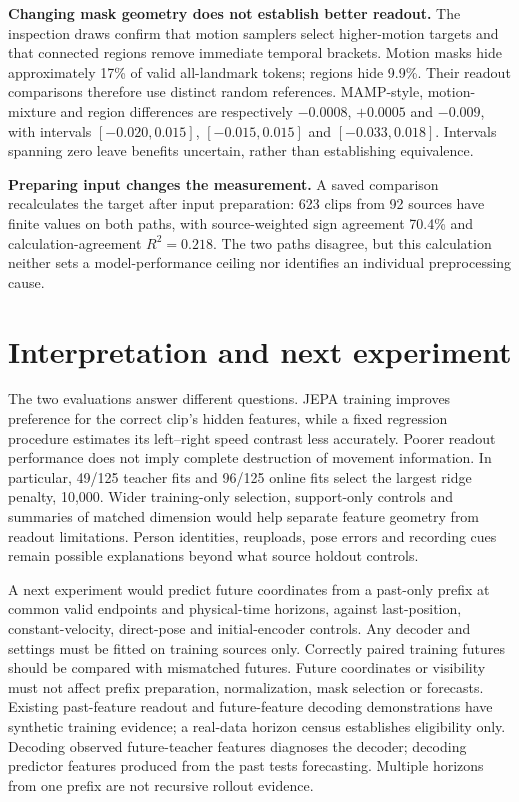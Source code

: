 \documentclass{article}
\begin{document}
\textbf{Changing mask geometry does not establish better readout.} The
inspection draws confirm that motion samplers select higher-motion
targets and that connected regions remove immediate temporal brackets.
Motion masks hide approximately 17\% of valid all-landmark tokens;
regions hide 9.9\%. Their readout comparisons therefore use distinct
random references. MAMP-style, motion-mixture and region differences are
respectively \(-0.0008\), \(+0.0005\) and \(-0.009\), with intervals
\([-0.020,0.015]\), \([-0.015,0.015]\) and \([-0.033,0.018]\). Intervals
spanning zero leave benefits uncertain, rather than establishing
equivalence.

\textbf{Preparing input changes the measurement.} A saved comparison
recalculates the target after input preparation: 623 clips from 92
sources have finite values on both paths, with source-weighted sign
agreement 70.4\% and calculation-agreement \(R^2=0.218\). The two paths
disagree, but this calculation neither sets a model-performance ceiling
nor identifies an individual preprocessing cause.

\section{Interpretation and next
experiment}\label{interpretation-and-next-experiment}

The two evaluations answer different questions. JEPA training improves
preference for the correct clip's hidden features, while a fixed
regression procedure estimates its left--right speed contrast less
accurately. Poorer readout performance does not imply complete
destruction of movement information. In particular, 49/125 teacher fits
and 96/125 online fits select the largest ridge penalty, 10,000. Wider
training-only selection, support-only controls and summaries of matched
dimension would help separate feature geometry from readout limitations.
Person identities, reuploads, pose errors and recording cues remain
possible explanations beyond what source holdout controls.

A next experiment would predict future coordinates from a past-only
prefix at common valid endpoints and physical-time horizons, against
last-position, constant-velocity, direct-pose and initial-encoder
controls. Any decoder and settings must be fitted on training sources
only. Correctly paired training futures should be compared with
mismatched futures. Future coordinates or visibility must not affect
prefix preparation, normalization, mask selection or forecasts. Existing
past-feature readout and future-feature decoding demonstrations have
synthetic training evidence; a real-data horizon census establishes
eligibility only. Decoding observed future-teacher features diagnoses
the decoder; decoding predictor features produced from the past tests
forecasting. Multiple horizons from one prefix are not recursive rollout
evidence.
\end{document}
